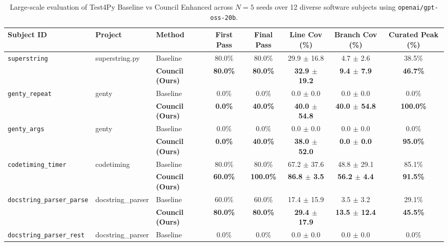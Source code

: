 \begin{table}[t]
\centering
\small
\caption{Large-scale evaluation of Test4Py Baseline vs Council Enhanced across $N=5$ seeds over 12 diverse software subjects using \texttt{openai/gpt-oss-20b}.}
\label{tab:expanded_120_eval}
\begin{tabular}{lll c c c c c}
\toprule
\textbf{Subject ID} & \textbf{Project} & \textbf{Method} & \textbf{First Pass} & \textbf{Final Pass} & \textbf{Line Cov (\%)} & \textbf{Branch Cov (\%)} & \textbf{Curated Peak (\%)} \\
\midrule
\multirow{2}{*}{\texttt{superstring}} & \multirow{2}{*}{superstring.py} & Baseline & 80.0\% & 80.0\% & 29.9 $\pm$ 16.8 & 4.7 $\pm$ 2.6 & 38.5\% \\
 & & \textbf{Council (Ours)} & \textbf{80.0\%} & \textbf{80.0\%} & \textbf{32.9 $\pm$ 19.2} & \textbf{9.4 $\pm$ 7.9} & \textbf{46.7\%} \\
\midrule
\multirow{2}{*}{\texttt{genty_repeat}} & \multirow{2}{*}{genty} & Baseline & 0.0\% & 0.0\% & 0.0 $\pm$ 0.0 & 0.0 $\pm$ 0.0 & 0.0\% \\
 & & \textbf{Council (Ours)} & \textbf{0.0\%} & \textbf{40.0\%} & \textbf{40.0 $\pm$ 54.8} & \textbf{40.0 $\pm$ 54.8} & \textbf{100.0\%} \\
\midrule
\multirow{2}{*}{\texttt{genty_args}} & \multirow{2}{*}{genty} & Baseline & 0.0\% & 0.0\% & 0.0 $\pm$ 0.0 & 0.0 $\pm$ 0.0 & 0.0\% \\
 & & \textbf{Council (Ours)} & \textbf{0.0\%} & \textbf{40.0\%} & \textbf{38.0 $\pm$ 52.0} & \textbf{0.0 $\pm$ 0.0} & \textbf{95.0\%} \\
\midrule
\multirow{2}{*}{\texttt{codetiming_timer}} & \multirow{2}{*}{codetiming} & Baseline & 80.0\% & 80.0\% & 67.2 $\pm$ 37.6 & 48.8 $\pm$ 29.1 & 85.1\% \\
 & & \textbf{Council (Ours)} & \textbf{60.0\%} & \textbf{100.0\%} & \textbf{86.8 $\pm$ 3.5} & \textbf{56.2 $\pm$ 4.4} & \textbf{91.5\%} \\
\midrule
\multirow{2}{*}{\texttt{docstring_parser_parse}} & \multirow{2}{*}{docstring_parser} & Baseline & 60.0\% & 60.0\% & 17.4 $\pm$ 15.9 & 3.5 $\pm$ 3.2 & 29.1\% \\
 & & \textbf{Council (Ours)} & \textbf{80.0\%} & \textbf{80.0\%} & \textbf{29.4 $\pm$ 17.9} & \textbf{13.5 $\pm$ 12.4} & \textbf{45.5\%} \\
\midrule
\multirow{2}{*}{\texttt{docstring_parser_rest}} & \multirow{2}{*}{docstring_parser} & Baseline & 0.0\% & 0.0\% & 0.0 $\pm$ 0.0 & 0.0 $\pm$ 0.0 & 0.0\% \\

\end{tabular}
\end{table}

